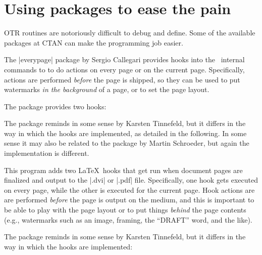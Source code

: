 %



\let\Lpack\docpkg



\section{Using packages to ease the pain}

OTR routines are notoriously difficult to debug and define. Some of the available packages at CTAN
can make the programming job easier.

The |everypage| package by Sergio Callegari provides hooks into the \latex\ internal commands to
to do actions on every page or on the current page. Specifically, actions  are performed \emph{before} the page is shipped, so they can be
used to put watermarks \emph{in the background} of a page, or to
set the page layout. 

The package provides two hooks:

\begin{teXXX}
  \AddThisPageHook
\end{teXXX}

The package reminds in some sense
 by Karsten Tinnefeld, but it differs in the way in
 which the hooks are implemented, as detailed in the following.
 In some sense it may also be related to the package
  by Martin Schroeder, but again the implementation
 is different.

 
 This program adds two \LaTeX\ hooks that get run when document
 pages are finalized and output to the |.dvi| or |.pdf|
 file. Specifically, one hook gets executed on every page, while the
 other is executed for the current page. Hook actions are are performed
 \emph{before} the page is output on the medium, and this is
 important to be able to play with the page layout or to put things
 \emph{behind} the page contents (e.g., watermarks such as an image,
 framing, the ``DRAFT'' word, and the like).
 
 The package reminds in some sense \Lpack{bobhook} by Karsten
 Tinnefeld, but it differs in the way in which the hooks are
 implemented:
 
